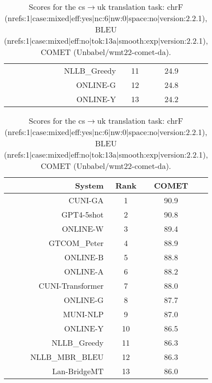 \documentclass[11pt]{article}
\begin{document}
\begin{table}[]
\begin{subtable}[t]{0.33\textwidth}
\begin{tabular}{rccc}
NLLB\_Greedy & 11 & 24.9 \\ 
ONLINE-G & 12 & 24.8 \\ 
ONLINE-Y & 13 & 24.2 \\ 
\bottomrule 
\end{tabular} 
\end{subtable} 
\begin{subtable}[t]{0.33\textwidth}
\begin{tabular}{rccc}
\toprule 
System & Rank & COMET \\ 
\midrule 
CUNI-GA & 1 & 90.9 \\ 
GPT4-5shot & 2 & 90.8 \\ 
ONLINE-W & 3 & 89.4 \\ 
GTCOM\_Peter & 4 & 88.9 \\ 
ONLINE-B & 5 & 88.8 \\ 
ONLINE-A & 6 & 88.2 \\ 
CUNI-Transformer & 7 & 88.0 \\ 
ONLINE-G & 8 & 87.7 \\ 
MUNI-NLP & 9 & 87.0 \\ 
ONLINE-Y & 10 & 86.5 \\ 
NLLB\_Greedy & 11 & 86.3 \\ 
NLLB\_MBR\_BLEU & 12 & 86.3 \\ 
Lan-BridgeMT & 13 & 86.0 \\ 
\bottomrule 
\end{tabular} 
\end{subtable} 
\caption{Scores for the cs$\rightarrow$uk translation task: chrF (nrefs:1|case:mixed|eff:yes|nc:6|nw:0|space:no|version:2.2.1), BLEU (nrefs:1|case:mixed|eff:no|tok:13a|smooth:exp|version:2.2.1), COMET (Unbabel/wmt22-comet-da).} 
\end{table} 
\end{document}
